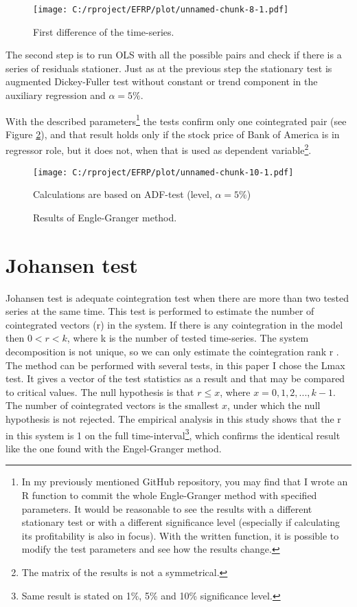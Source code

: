 \documentclass[12pt, a4paper, twoside, titlepage]{article}
\begin{document}
\begin{figure}[ht]
  \centering
  \texttt{[image: C:/rproject/EFRP/plot/unnamed-chunk-8-1.pdf]}
  \caption{First difference of the time-series.}
  \label{fig3}
\end{figure}

The second step is to run OLS with all the possible pairs and check if there is a series of residuals stationer. Just as at the previous step the stationary test is augmented Dickey-Fuller test without constant or trend component in the auxiliary regression and $\alpha = 5\%$.

With the described parameters\footnote{In my previously mentioned GitHub repository, you may find that I wrote an R function to commit the whole Engle-Granger method with specified parameters. It would be reasonable to see the results with a different stationary test or with a different significance level (especially if calculating its profitability is also in focus). With the written function, it is possible to modify the test parameters and see how the results change.} the tests confirm only one cointegrated pair (see Figure \ref{fig4}), and that result holds only if the stock price of Bank of America is in regressor role, but it does not, when that is used as dependent variable\footnote{The matrix of the results is not a symmetrical.}.

\begin{figure}[ht]
  \centering
  \texttt{[image: C:/rproject/EFRP/plot/unnamed-chunk-10-1.pdf]}
  \caption{Results of Engle-Granger method.}
  \label{fig4}
  Calculations are based on ADF-test (level, $\alpha = 5\%$)
\end{figure}

\section{Johansen test}

Johansen test is adequate cointegration test when there are more than two tested series at the same time. This test is performed to estimate the number of cointegrated vectors (r) in the system. If there is any cointegration in the model then $0<r<k$, where k is the number of tested time-series. The system decomposition is not unique, so we can only estimate the cointegration rank r \cite{Kirchgassner.2007}.
The method can be performed with several tests, in this paper I chose the Lmax test. It gives a vector of the test statistics as a result and that may be compared to critical values. The null hypothesis is that $r \leq x$, where $x = 0, 1, 2, ..., k-1$. The number of cointegrated vectors is the smallest $x$, under which the null hypothesis is not rejected. The empirical analysis in this study shows that the r in this system is 1 on the full time-interval\footnote{Same result is stated on 1\%, 5\% and 10\% significance level.}, which confirms the identical result like the one found with the Engel-Granger method.
\end{document}

